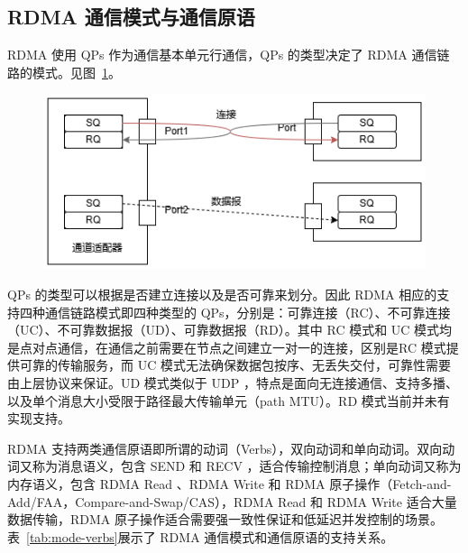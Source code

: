{\subsection{RDMA 通信模式与通信原语}
RDMA 使用 QPs 作为通信基本单元行通信，QPs 的类型决定了 RDMA 通信链路的模式。见图~\ref{fig:rdma-queue-pairs}。
\begin{figure}[!htbp]
    \centering
    \includegraphics[width=\linewidth]{Img/QueuePairs.png}
    \label{fig:rdma-queue-pairs}
\end{figure}

QPs 的类型可以根据是否建立连接以及是否可靠来划分。因此 RDMA 相应的支持四种通信链路模式即四种类型的 QPs，分别是：可靠连接（RC）、不可靠连接（UC）、不可靠数据报（UD）、可靠数据报（RD）。其中 RC 模式和 UC 模式均是点对点通信，在通信之前需要在节点之间建立一对一的连接，区别是RC 模式提供可靠的传输服务，而 UC 模式无法确保数据包按序、无丢失交付，可靠性需要由上层协议来保证。UD 模式类似于 UDP ，特点是面向无连接通信、支持多播、以及单个消息大小受限于路径最大传输单元（path MTU）。RD 模式当前并未有实现支持。

RDMA 支持两类通信原语即所谓的动词（Verbs），双向动词和单向动词。双向动词又称为消息语义，包含 SEND 和 RECV ，适合传输控制消息；单向动词又称为内存语义，包含 RDMA Read 、RDMA Write 和 RDMA 原子操作（Fetch-and-Add/FAA，Compare-and-Swap/CAS），RDMA Read 和 RDMA Write 适合大量数据传输，RDMA 原子操作适合需要强一致性保证和低延迟并发控制的场景。表~\ref{tab:mode-verbs}展示了 RDMA 通信模式和通信原语的支持关系。

}
